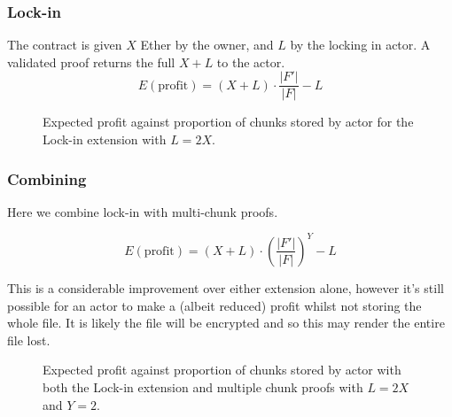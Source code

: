 \documentclass[10pt,twoside,a4paper]{article}
\begin{document}
\subsubsection{Lock-in}

The contract is given $X$ Ether by the owner, and $L$ by the locking in actor.
A validated proof returns the full $X + L$ to the actor.
\[E(\text{profit}) = (X + L) \cdot \frac{|F'|}{|F|} - L\]


\begin{figure}[H]

\caption[Expected attacker profit: lock-in]{Expected profit against proportion of chunks stored by actor for the Lock-in extension with $L = 2X$.}
\end{figure}


\subsubsection{Combining} \label{combine-ext}

Here we combine lock-in with multi-chunk proofs.

\[E(\text{profit}) = (X + L) \cdot \left(\frac{|F'|}{|F|}\right)^Y - L\]

This is a considerable improvement over either extension alone, however it's still possible for an actor to make a  (albeit reduced) profit
whilst not storing the whole file. It is likely the file will be encrypted and so this may render the entire file lost.

\begin{figure}[H]

\caption[Expected attacker profit: multiple chunk proofs and lock-in]{Expected profit against proportion of chunks stored by actor with both the Lock-in extension and multiple chunk proofs with $L = 2X$ and $Y = 2$.}
\end{figure}
\end{document}
